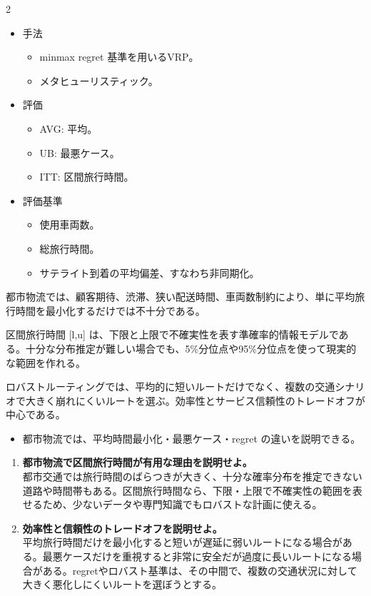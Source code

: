 \clearpage
{}
\begin{multicols}{2}\footnotesize\raggedcolumns
{}
\begin{itemize}
\item 手法
\begin{itemize}
\item minmax regret 基準を用いるVRP。
\item メタヒューリスティック。
\end{itemize}
\item 評価
\begin{itemize}
\item AVG: 平均。
\item UB: 最悪ケース。
\item ITT: 区間旅行時間。
\end{itemize}
\item 評価基準
\begin{itemize}
\item 使用車両数。
\item 総旅行時間。
\item サテライト到着の平均偏差、すなわち非同期化。
\end{itemize}
\end{itemize}
都市物流では、顧客期待、渋滞、狭い配送時間、車両数制約により、単に平均旅行時間を最小化するだけでは不十分である。\par

区間旅行時間 [l,u] は、下限と上限で不確実性を表す準確率的情報モデルである。十分な分布推定が難しい場合でも、5\%分位点や95\%分位点を使って現実的な範囲を作れる。\par

ロバストルーティングでは、平均的に短いルートだけでなく、複数の交通シナリオで大きく崩れにくいルートを選ぶ。効率性とサービス信頼性のトレードオフが中心である。\par
{}
\begin{itemize}
\item 都市物流では、平均時間最小化・最悪ケース・regret の違いを説明できる。
\end{itemize}
\begin{enumerate}
\item \textbf{都市物流で区間旅行時間が有用な理由を説明せよ。}\\都市交通では旅行時間のばらつきが大きく、十分な確率分布を推定できない道路や時間帯もある。区間旅行時間なら、下限・上限で不確実性の範囲を表せるため、少ないデータや専門知識でもロバストな計画に使える。
\item \textbf{効率性と信頼性のトレードオフを説明せよ。}\\平均旅行時間だけを最小化すると短いが遅延に弱いルートになる場合がある。最悪ケースだけを重視すると非常に安全だが過度に長いルートになる場合がある。regretやロバスト基準は、その中間で、複数の交通状況に対して大きく悪化しにくいルートを選ぼうとする。
\end{enumerate}
\end{multicols}

